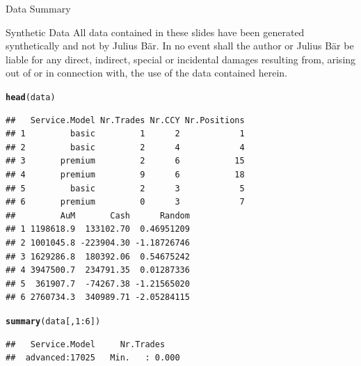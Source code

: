 \documentclass{beamer}\usepackage[]{graphicx}\usepackage[]{color}
\makeatletter
\newcommand{\hlnum}[1]{\textcolor[rgb]{0.686,0.059,0.569}{#1}}%
\newcommand{\hlopt}[1]{\textcolor[rgb]{0,0,0}{#1}}%
\newcommand{\hlstd}[1]{\textcolor[rgb]{0.345,0.345,0.345}{#1}}%
\newcommand{\hlkwd}[1]{\textcolor[rgb]{0.737,0.353,0.396}{\textbf{#1}}}%
\newenvironment{kframe}{%
 \def\at@end@of@kframe{}%
 \ifinner\ifhmode%
  \def\at@end@of@kframe{\end{minipage}}%
  \begin{minipage}{\columnwidth}%
 \fi\fi%
 \def\FrameCommand##1{\hskip\@totalleftmargin \hskip-\fboxsep
 \colorbox{shadecolor}{##1}\hskip-\fboxsep
     \hskip-\linewidth \hskip-\@totalleftmargin \hskip\columnwidth}%
 \MakeFramed {\advance\hsize-\width
   \@totalleftmargin\z@ \linewidth\hsize
   \@setminipage}}%
 {\par\unskip\endMakeFramed%
 \at@end@of@kframe}
\newenvironment{knitrout}{}{} %
\makeatother
\begin{document}
\begin{frame}[fragile]{Data Summary}

\tiny
{
\begin{block}{\tiny Synthetic Data}
All data contained in these slides have been generated synthetically and not by Julius B\"{a}r. In no event shall the author or Julius B\"{a}r be liable for any direct, indirect, special or incidental damages resulting from, arising out of or in connection with, the use of the data contained herein.
\end{block}
}
\begin{minipage}[t]{0.45\textwidth}
  \vspace{0pt}

  
\begin{knitrout}
\color{fgcolor}\begin{kframe}
\begin{alltt}
\hlkwd{head}\hlstd{(data)}
\end{alltt}
\begin{verbatim}
##   Service.Model Nr.Trades Nr.CCY Nr.Positions
## 1         basic         1      2            1
## 2         basic         2      4            4
## 3       premium         2      6           15
## 4       premium         9      6           18
## 5         basic         2      3            5
## 6       premium         0      3            7
##         AuM       Cash      Random
## 1 1198618.9  133102.70  0.46951209
## 2 1001045.8 -223904.30 -1.18726746
## 3 1629286.8  180392.06  0.54675242
## 4 3947500.7  234791.35  0.01287336
## 5  361907.7  -74267.38 -1.21565020
## 6 2760734.3  340989.71 -2.05284115
\end{verbatim}
\end{kframe}
\end{knitrout}
\end{minipage}
\hfill
\begin{minipage}[t]{0.45\textwidth}
  \vspace{0pt}
\begin{knitrout}
\color{fgcolor}\begin{kframe}
\begin{alltt}
\hlkwd{summary}\hlstd{(data[,}\hlnum{1}\hlopt{:}\hlnum{6}\hlstd{])}
\end{alltt}
\begin{verbatim}
##   Service.Model     Nr.Trades     
##  advanced:17025   Min.   : 0.000  

\end{verbatim}
\end{kframe}
\end{knitrout}
\end{minipage}
\end{frame}
\end{document}

